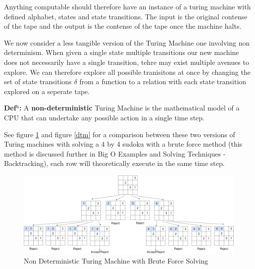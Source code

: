 \documentclass[a4paper,11pt]{report}
\newcounter{row}
\begin{document}
Anything computable should therefore have an instance of a turing machine with defined alphabet, states and state transitions. The input is the original contense of the tape and the output is the contense of the tape once the machine halts. 

We now consider a less tangible version of the Turing Machine one involving non determinism. When given a single state multiple transitions our new machine does not necessarily have a single transition, tehre may exist multiple avenues to explore. We can therefore explore all possible tranisitons at once by changing the set of state transitions $\delta$ from a function to a relation with each state transition explored on a seperate tape. 

\textbf{Def$^\text{n}$:} A \textbf{non-deterministic} Turing Machine is the mathematical model of a CPU that can undertake any possible action in a single time step.

See figure \ref{ndtm} and figure \ref{dtm} for a comparison between these two versions of Turing machines with solving a 4 by 4 sudoku with a brute force method (this method is discussed further in Big O Examples and Solving Techniques - Backtracking), each row will theoretically execute in the same time step.

\begin{figure}[h!]
	\begin{center}
		\includegraphics[width=180mm]{figures/turing_non_determinism.png}
	\end{center}
	\caption{\label{ndtm} Non Deterministic Turing Machine with Brute Force Solving}
\end{figure}
\end{document}
